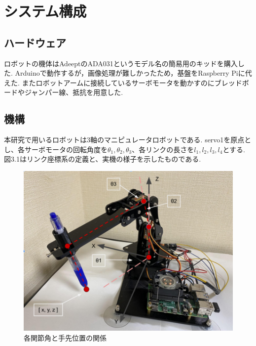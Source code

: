 \chapter{システム構成}
  \label{chap:system}
  \section{ハードウェア}
  	\label{chap:hardware}
 	ロボットの機体はAdeeptのADA031というモデル名の簡易用のキッドを購入した. Arduinoで動作するが，画像処理が難しかったため，基盤をRaspberry Piに代えた. またロボットアームに接続しているサーボモータを動かすのにブレッドボードやジャンパー線、抵抗を用意した.
  \section{機構}
  	\label{chap:mechanism}
	本研究で用いるロボットは3軸のマニピュレータロボットである. servo1を原点とし、各サーボモータの回転角度を$\theta_1, \theta_2, \theta_3$、各リンクの長さを$l_1, l_2, l_3, l_4$とする. 図3.1はリンク座標系の定義と、実機の様子を示したものである.
		 \begin{center}
        \begin{figure}[h]
            \includegraphics[width=1.0\textwidth]{./img/004.png}
            \caption{各関節角と手先位置の関係}
            \label{test}
        \end{figure}
    \end{center}

